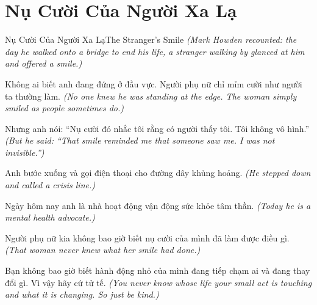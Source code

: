 \section{Nụ Cười Của Người Xa Lạ}
\begin{truyen}{Nụ Cười Của Người Xa Lạ}{The Stranger's Smile}
\textit{(Mark Howden recounted: the day he walked onto a bridge to end his life, a stranger walking by glanced at him and offered a smile.)}

Không ai biết anh đang đứng ở đầu vực. Người phụ nữ chỉ mỉm cười như người ta thường làm.
\textit{(No one knew he was standing at the edge. The woman simply smiled as people sometimes do.)}

Nhưng anh nói: ``Nụ cười đó nhắc tôi rằng có người thấy tôi. Tôi không vô hình.''
\textit{(But he said: ``That smile reminded me that someone saw me. I was not invisible.'')}

Anh bước xuống và gọi điện thoại cho đường dây khủng hoảng.
\textit{(He stepped down and called a crisis line.)}

Ngày hôm nay anh là nhà hoạt động vận động sức khỏe tâm thần.
\textit{(Today he is a mental health advocate.)}

Người phụ nữ kia không bao giờ biết nụ cười của mình đã làm được điều gì.
\textit{(That woman never knew what her smile had done.)}

\end{truyen}

\begin{baihoc}
Bạn không bao giờ biết hành động nhỏ của mình đang tiếp chạm ai và đang thay đổi gì. Vì vậy hãy cứ tử tế.
\textit{(You never know whose life your small act is touching and what it is changing. So just be kind.)}
\end{baihoc}
